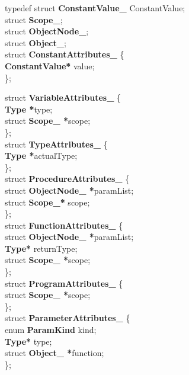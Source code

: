 \documentclass[12pt, a4paper]{report}
\begin{document}
\begin{enumerate}
						typedef struct \textbf{ConstantValue\_} ConstantValue;\\

						struct \textbf{Scope\_};\\
						struct \textbf{ObjectNode\_};\\
						struct \textbf{Object\_};\\
						
						struct \textbf{ConstantAttributes\_} \{\\
						  \textbf{ConstantValue*} value;\\
						\};
						
						struct \textbf{VariableAttributes\_} \{\\
						  \textbf{Type *}type;\\
						  struct \textbf{Scope\_ *}scope;\\
						\};\\
						
						struct \textbf{TypeAttributes\_} \{\\
						  \textbf{Type *}actualType;\\
						\};\\
						
						struct \textbf{ProcedureAttributes\_} \{\\
						  struct \textbf{ObjectNode\_ *}paramList;\\
						  struct \textbf{Scope\_*} scope;\\
						\};\\
						
						struct \textbf{FunctionAttributes\_} \{\\
						  struct \textbf{ObjectNode\_ *}paramList;\\
						  \textbf{Type*} returnType;\\
						  struct \textbf{Scope\_ *}scope;\\
						\};\\
						
						struct \textbf{ProgramAttributes\_} \{\\
						  struct \textbf{Scope\_ *}scope;\\
						\};\\
						
						struct \textbf{ParameterAttributes\_} \{\\
						  enum \textbf{ParamKind} kind;\\
						  \textbf{Type*} type;\\
						  struct \textbf{Object\_ *}function;\\
						\};\\
						

\end{enumerate}
\end{document}
